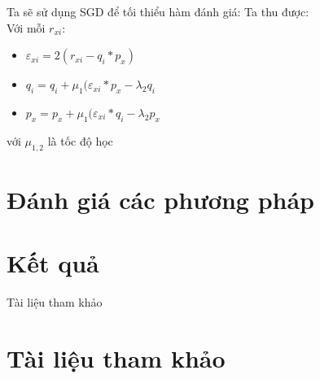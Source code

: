 \documentclass{beamer}
\begin{document}
\begin{frame}
Ta sẽ sử dụng SGD để tối thiểu hàm đánh giá:
Ta thu được: \\
Với mỗi $r_{xi}:$
\begin{itemize}
\item $\varepsilon_{xi} =2(r_{xi}-q_i*p_x)$
\item $q_i=q_i+\mu_1(\varepsilon_{xi}*p_x-\lambda_2q_i$
\item $p_x=p_x+\mu_1(\varepsilon_{xi}*q_i-\lambda_2p_x$

\end{itemize}
với $\mu_{1,2}$ là tốc độ học 
\end{frame}
\section{Đánh giá các phương pháp}
\section{Kết quả}
\begin{frame}{Tài liệu tham khảo}
\section*{Tài liệu tham khảo}

\end{frame}
\end{document}
